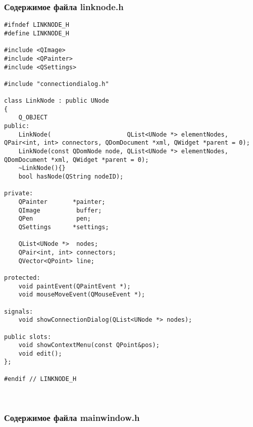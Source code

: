 \subsubsection*{Содержимое файла linknode.h}

\begin{lstlisting}
#ifndef LINKNODE_H
#define LINKNODE_H

#include <QImage>
#include <QPainter>
#include <QSettings>

#include "connectiondialog.h"

class LinkNode : public UNode
{
    Q_OBJECT
public:
    LinkNode(                     QList<UNode *> elementNodes, QPair<int, int> connectors, QDomDocument *xml, QWidget *parent = 0);
    LinkNode(const QDomNode node, QList<UNode *> elementNodes,                             QDomDocument *xml, QWidget *parent = 0);
    ~LinkNode(){}
    bool hasNode(QString nodeID);

private:
    QPainter       *painter;
    QImage          buffer;
    QPen            pen;
    QSettings      *settings;

    QList<UNode *>  nodes;
    QPair<int, int> connectors;
    QVector<QPoint> line;

protected:
    void paintEvent(QPaintEvent *);
    void mouseMoveEvent(QMouseEvent *);

signals:
    void showConnectionDialog(QList<UNode *> nodes);

public slots:
    void showContextMenu(const QPoint&pos);
    void edit();
};

#endif // LINKNODE_H
\end{lstlisting}~\\

\subsubsection*{Содержимое файла mainwindow.h}

